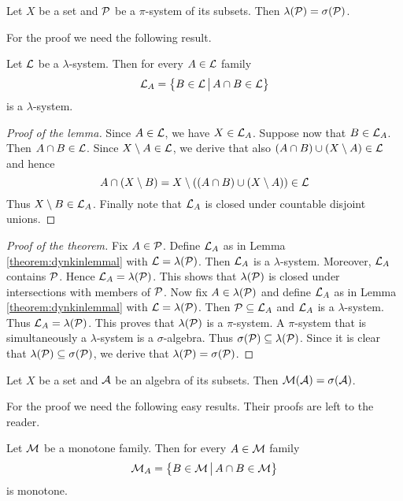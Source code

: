 \begin{theorem}\label{theorem:dynkinlemma}
Let $X$ be a set and ${\mathcal P}$ be a $\pi$-system of its subsets. Then $\lambda({\mathcal P})=\sigma({\mathcal P})$.
\end{theorem}
\noindent
For the proof we need the following result.

\begin{lemma}\label{theorem:dynkinlemmal}
Let ${\mathcal L}$ be a $\lambda$-system. Then for every $A\in {\mathcal L}$ family
$${\mathcal L}_A=\big\{B\in {\mathcal L}\,\big|\,A\cap B\in {\mathcal L} \big\}$$
is a $\lambda$-system.
\end{lemma}
\begin{proof}[Proof of the lemma]
Since $A\in {\mathcal L}$, we have $X\in {\mathcal L}_A$. Suppose now that $B\in {\mathcal L}_A$. Then $A\cap B\in {\mathcal L}$. Since $X\setminus A\in {\mathcal L}$, we derive that also $(A\cap B)\cup (X\setminus A)\in {\mathcal L}$ and hence
$$A\cap (X\setminus B)=X\setminus \left(\left(A\cap B\right)\cup (X\setminus A)\right)\in {\mathcal L}$$
Thus $X\setminus B\in {\mathcal L}_A$. Finally note that ${\mathcal L}_A$ is closed under countable disjoint unions. 
\end{proof}

\begin{proof}[Proof of the theorem]
Fix $A\in {\mathcal P}$. Define ${\mathcal L}_A$ as in Lemma \ref{theorem:dynkinlemmal} with ${\mathcal L} = \lambda({\mathcal P})$. Then ${\mathcal L}_A$ is a $\lambda$-system. Moreover, ${\mathcal L}_A$ contains ${\mathcal P}$. Hence ${\mathcal L}_A=\lambda({\mathcal P})$. This shows that $\lambda({\mathcal P})$ is closed under intersections with members of ${\mathcal P}$. Now fix $A\in \lambda({\mathcal P})$ and define ${\mathcal L}_A$ as in Lemma \ref{theorem:dynkinlemmal} with ${\mathcal L} = \lambda({\mathcal P})$. Then ${\mathcal P}\subseteq {\mathcal L}_A$ and ${\mathcal L}_A$ is a $\lambda$-system. Thus ${\mathcal L}_A=\lambda({\mathcal P})$. This proves that $\lambda({\mathcal P})$ is a $\pi$-system. A $\pi$-system that is simultaneously a $\lambda$-system is a $\sigma$-algebra. Thus $\sigma({\mathcal P})\subseteq \lambda({\mathcal P})$. Since it is clear that $\lambda({\mathcal P})\subseteq \sigma({\mathcal P})$, we derive that $\lambda({\mathcal P})=\sigma({\mathcal P})$.
\end{proof}

\begin{theorem}\label{theorem:monotoneclasses}
Let $X$ be a set and ${\mathcal A}$ be an algebra of its subsets. Then ${\mathcal M}({\mathcal A})=\sigma({\mathcal A})$.
\end{theorem}
\noindent
For the proof we need the following easy results. Their proofs are left to the reader.

\begin{lemma}\label{lemma:firstmonotoneclasses}
Let ${\mathcal M}$ be a monotone family. Then for every $A\in {\mathcal M}$ family
$${\mathcal M}_A=\big\{B\in {\mathcal M}\,\big|\,A\cap B\in {\mathcal M}\big\}$$
is monotone.
\end{lemma}

